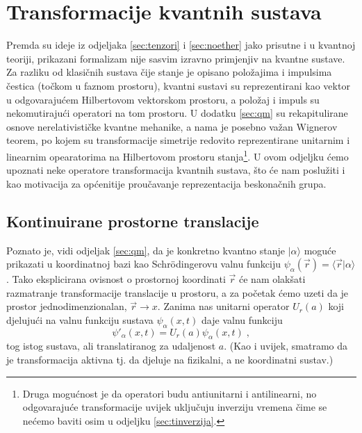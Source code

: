 \section{Transformacije kvantnih sustava}
\label{sec:qmtrans}

Premda su ideje iz odjeljaka \ref{sec:tenzori} i \ref{sec:noether}
jako prisutne i u kvantnoj teoriji, prikazani formalizam nije sasvim
izravno primjenjiv na kvantne sustave. Za razliku od klasičnih sustava
čije stanje je opisano položajima i impulsima čestica (točkom u faznom
prostoru), kvantni sustavi su reprezentirani kao vektor
u odgovarajućem Hilbertovom vektorskom prostoru, a položaj i impuls
su nekomutirajući operatori na tom prostoru. U dodatku \ref{sec:qm}
su rekapitulirane osnove nerelativističke kvantne mehanike, a
nama je posebno važan Wignerov teorem, po kojem su transformacije simetrije
redovito reprezentirane unitarnim i linearnim opearatorima na
Hilbertovom prostoru stanja\footnote{Druga mogućnost je da operatori
    budu antiunitarni i antilinearni, no odgovarajuće transformacije
    uvijek uključuju inverziju vremena čime se nećemo baviti osim
u odjeljku \ref{sec:tinverzija}.}.
U ovom odjeljku ćemo upoznati neke operatore transformacija kvantnih
sustava, što će nam poslužiti i kao motivacija za općenitije
proučavanje reprezentacija beskonačnih grupa.

\subsection{Kontinuirane prostorne translacije}
\label{sec:prostornetranslacije}

Poznato je, vidi odjeljak \ref{sec:qm}, da je konkretno kvantno stanje
$|\alpha\rangle$ moguće prikazati u koordinatnoj bazi kao Schr\"{o}dingerovu
valnu funkciju $\psi_{\alpha}(\vec{r}) = \langle \vec{r} | \alpha\rangle$.
Tako eksplicirana ovisnost o prostornoj koordinati $\vec{r}$ će nam
olakšati razmatranje transformacije translacije u prostoru, a za početak
ćemo uzeti da je prostor jednodimenzionalan, $\vec{r} \to x$.
Zanima nas unitarni operator $U_{r}(a)$ koji djelujući na valnu
funkciju sustava $\psi_{\alpha}(x, t)$ daje valnu funkciju 
\begin{equation}
  \psi'_{\alpha}(x,t)= U_{r}(a)\psi_{\alpha}(x,t) \;,
\end{equation}
tog istog sustava, ali translatiranog za udaljenost $a$. (Kao i uvijek,
smatramo da je transformacija aktivna tj. da djeluje na fizikalni,
a ne koordinatni sustav.)

